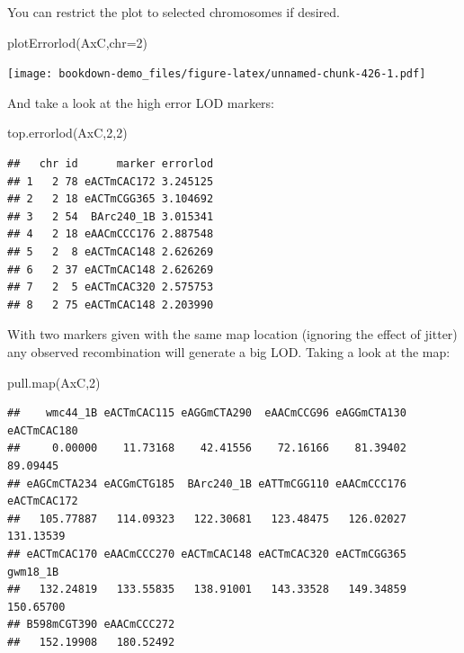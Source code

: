 \documentclass[
]{book}
\newenvironment{Shaded}{\begin{snugshade}}{\end{snugshade}}
\newcommand{\AttributeTok}[1]{\textcolor[rgb]{0.77,0.63,0.00}{#1}}
\newcommand{\DecValTok}[1]{\textcolor[rgb]{0.00,0.00,0.81}{#1}}
\newcommand{\FunctionTok}[1]{\textcolor[rgb]{0.00,0.00,0.00}{#1}}
\newcommand{\NormalTok}[1]{#1}
\begin{document}
You can restrict the plot to selected chromosomes if desired.

\begin{Shaded}
\begin{Highlighting}[]
\FunctionTok{plotErrorlod}\NormalTok{(AxC,}\AttributeTok{chr=}\DecValTok{2}\NormalTok{) }
\end{Highlighting}
\end{Shaded}

\texttt{[image: bookdown-demo\_files/figure-latex/unnamed-chunk-426-1.pdf]}

And take a look at the high error LOD markers:

\begin{Shaded}
\begin{Highlighting}[]
\FunctionTok{top.errorlod}\NormalTok{(AxC,}\DecValTok{2}\NormalTok{,}\DecValTok{2}\NormalTok{)}
\end{Highlighting}
\end{Shaded}

\begin{verbatim}
##   chr id      marker errorlod
## 1   2 78 eACTmCAC172 3.245125
## 2   2 18 eACTmCGG365 3.104692
## 3   2 54  BArc240_1B 3.015341
## 4   2 18 eAACmCCC176 2.887548
## 5   2  8 eACTmCAC148 2.626269
## 6   2 37 eACTmCAC148 2.626269
## 7   2  5 eACTmCAC320 2.575753
## 8   2 75 eACTmCAC148 2.203990
\end{verbatim}

With two markers given with the same map location (ignoring the effect of jitter) any observed recombination will generate a big LOD. Taking a look at the map:

\begin{Shaded}
\begin{Highlighting}[]
\FunctionTok{pull.map}\NormalTok{(AxC,}\DecValTok{2}\NormalTok{) }
\end{Highlighting}
\end{Shaded}

\begin{verbatim}
##    wmc44_1B eACTmCAC115 eAGGmCTA290  eAACmCCG96 eAGGmCTA130 eACTmCAC180 
##     0.00000    11.73168    42.41556    72.16166    81.39402    89.09445 
## eAGCmCTA234 eACGmCTG185  BArc240_1B eATTmCGG110 eAACmCCC176 eACTmCAC172 
##   105.77887   114.09323   122.30681   123.48475   126.02027   131.13539 
## eACTmCAC170 eAACmCCC270 eACTmCAC148 eACTmCAC320 eACTmCGG365    gwm18_1B 
##   132.24819   133.55835   138.91001   143.33528   149.34859   150.65700 
## B598mCGT390 eAACmCCC272 
##   152.19908   180.52492
\end{verbatim}
\end{document}
